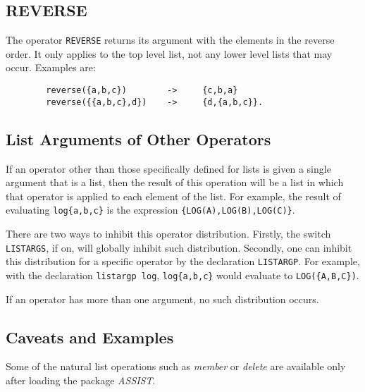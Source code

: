 \subsection{REVERSE}
\hypertarget{operator:REVERSE}{}

The operator {\tt REVERSE} returns its argument with the
elements in the reverse order.  It only applies to the top level list, not
any lower level lists that may occur.  Examples are:
\begin{verbatim}
        reverse({a,b,c})        ->     {c,b,a}
        reverse({{a,b,c},d})    ->     {d,{a,b,c}}.
\end{verbatim}

\subsection{List Arguments of Other Operators}
\hypertarget{switch:LISTARGS}{}
\hypertarget{command:LISTARGP}{}

If an operator other than those specifically defined for lists is given a
single argument that is a list, then the result of this operation will be
a list in which that operator is applied to each element of the list.  For
example, the result of evaluating {\tt log\{a,b,c\}} is the expression
{\tt \{LOG(A),LOG(B),LOG(C)\}}.

There are two ways to inhibit this operator distribution.  Firstly, the
switch {\tt LISTARGS}, if on, will globally inhibit
such distribution.  Secondly, one can inhibit this distribution for a
specific operator by the declaration {\tt LISTARGP}. For
example, with the declaration {\tt listargp log}, {\tt log\{a,b,c\}} would
evaluate to {\tt LOG(\{A,B,C\})}.

If an operator has more than one argument, no such distribution occurs.

\subsection{Caveats and Examples}

Some of the natural list operations such as {\it member} or {\it delete}
are available only after loading the package {\it ASSIST}.

